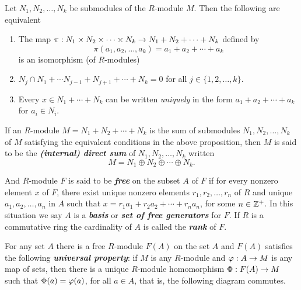 \nl

\begin{prop}
Let $N_1,N_2,\ldots,N_k$ be submodules of the $R$-module $M$. Then the following are equivalent
\begin{enumerate}
\item The map $\pi:N_1\times N_2\times \cdots \times N_k\rightarrow N_1 + N_2 + \cdots + N_k$ defined by 
\[\pi(a_1,a_2,\ldots,a_k) = a_1 + a_2+\cdots + a_k\]
is an isomorphism (of $R$-modules)
\item $N_j\cap N_1+\cdots N_{j-1} + N_{j + 1} +\cdots +N_k = 0$ for all $j\in \{1,2,\ldots, k\}$.
\item Every $x\in N_1+\cdots + N_k$ can be written \textit{uniquely} in the form $a_1 + a_2 + \cdots + a_k$ for $a_i \in N_i$.
\end{enumerate}
\end{prop}

\nl

\begin{defn}
If an $R$-module $M = N_1 + N_2 + \cdots + N_k$ is the sum of submodules $N_1,N_2,\ldots,N_k$ of $M$ satisfying the equivalent conditions in the above proposition, then $M$ is said to be the \textit{\textbf{(internal) direct sum}} of $N_1, N_2, \ldots, N_k$ written
\[M = N_1 \oplus N_2 \oplus \cdots \oplus N_k.\]
\end{defn}

\nl

\begin{defn}
And $R$-module $F$ is said to be \textbf{\textit{free}} on the subset $A$ of $F$ if for every nonzero element $x$ of $F$, there exist unique nonzero elements $r_1,r_2,\ldots, r_n$ of $R$ and unique $a_1,a_2,\ldots, a_n$ in $A$ such that $x = r_1a_1 + r_2 a_2 + \cdots + r_n a_n$, for some $n\in \mathbb{Z}^+$. In this situation we say $A$ is a \textbf{\textit{basis}} or \textbf{\textit{set of free generators}} for $F$. If $R$ is a commutative ring the cardinality of $A$ is called the \textbf{\textit{rank}} of $F$.
\end{defn}

\nl

\begin{thm}
For any set $A$ there is a free $R$-module $F(A)$ on the set $A$ and $F(A)$ satisfies the following \textbf{\textit{universal property}}: if $M$ is any $R$-module and $\varphi: A\rightarrow M$ is any map of sets, then there is a unique $R$-module homomorphism $\Phi:F(A) \rightarrow M$ such that $\Phi(a) = \varphi(a)$, for all $a\in A$, that is, the following diagram commutes.

\begin{center}
\end{center}

\end{thm}

